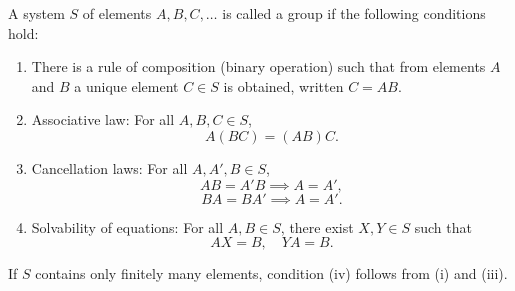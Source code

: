 A system $S$ of elements $A, B, C, \ldots$ is called a group if the following conditions hold:

\begin{enumerate}
\item[(i)] There is a rule of composition (binary operation) such that from elements $A$ and $B$ a unique element $C \in S$ is obtained, written $C = AB$.

\item[(ii)] Associative law: For all $A, B, C \in S$,
$$A(BC) = (AB)C.$$

\item[(iii)] Cancellation laws: For all $A, A', B \in S$,
$$AB = A'B \implies A = A',$$
$$BA = BA' \implies A = A'.$$

\item[(iv)] Solvability of equations: For all $A, B \in S$, there exist $X, Y \in S$ such that
$$AX = B, \quad YA = B.$$
\end{enumerate}

If $S$ contains only finitely many elements, condition (iv) follows from (i) and (iii).
